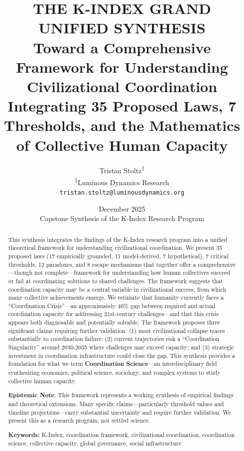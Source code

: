 \documentclass[12pt,letterpaper]{article}
\title{\textbf{THE K-INDEX GRAND UNIFIED SYNTHESIS}\\[0.5cm]
\Large Toward a Comprehensive Framework for Understanding Civilizational Coordination\\[0.3cm]
\large Integrating 35 Proposed Laws, 7 Thresholds, and the Mathematics of Collective Human Capacity}
\author{Tristan Stoltz\textsuperscript{1}\\[0.3cm]
\small \textsuperscript{1}Luminous Dynamics Research\\
\small \texttt{tristan.stoltz@luminousdynamics.org}}
\date{December 2025\\[0.3cm]
\small Capstone Synthesis of the K-Index Research Program}
\begin{document}
\maketitle

\begin{abstract}
This synthesis integrates the findings of the K-Index research program into a unified theoretical framework for understanding civilizational coordination. We present 35 proposed laws (17 empirically grounded, 11 model-derived, 7 hypothetical), 7 critical thresholds, 12 paradoxes, and 8 escape mechanisms that together offer a comprehensive---though not complete---framework for understanding how human collectives succeed or fail at coordinating solutions to shared challenges. The framework suggests that coordination capacity may be a central variable in civilizational success, from which many collective achievements emerge. We estimate that humanity currently faces a ``Coordination Crisis''---an approximately 40\% gap between required and actual coordination capacity for addressing 21st-century challenges---and that this crisis appears both diagnosable and potentially solvable. The framework proposes three significant claims requiring further validation: (1) most civilizational collapse traces substantially to coordination failure; (2) current trajectories risk a ``Coordination Singularity'' around 2030-2035 where challenges may exceed capacity; and (3) strategic investment in coordination infrastructure could close the gap. This synthesis provides a foundation for what we term \textbf{Coordination Science}---an interdisciplinary field synthesizing economics, political science, sociology, and complex systems to study collective human capacity.

\textbf{Epistemic Note}: This framework represents a working synthesis of empirical findings and theoretical extensions. Many specific claims---particularly threshold values and timeline projections---carry substantial uncertainty and require further validation. We present this as a research program, not settled science.

\vspace{0.3cm}
\noindent\textbf{Keywords:} K-Index, coordination framework, civilizational coordination, coordination science, collective capacity, global governance, social infrastructure
\end{abstract}

\newpage
\tableofcontents
\newpage

\end{document}
